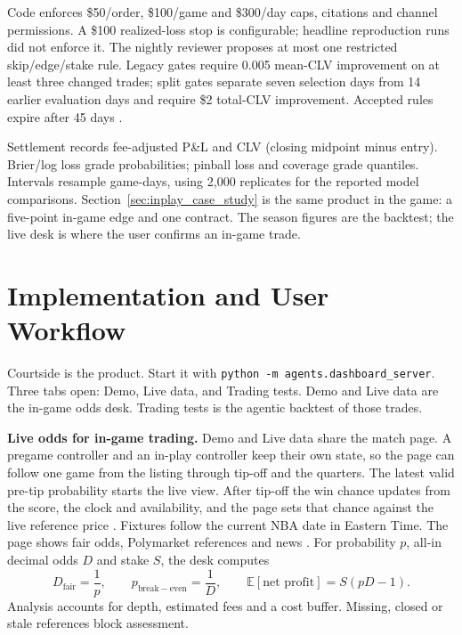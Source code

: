 \documentclass[11pt,a4paper]{article}
\begin{document}
Code enforces \$50/order, \$100/game and \$300/day caps, citations and channel
permissions. A \$100 realized-loss stop is configurable; headline reproduction
runs did not enforce it. The nightly reviewer proposes at most one restricted
skip/edge/stake rule. Legacy gates require 0.005 mean-CLV improvement on at
least three changed trades; split gates separate seven selection days from
14 earlier evaluation days and require \$2 total-CLV improvement. Accepted
rules expire after 45 days \cite{gate-audit}.

Settlement records fee-adjusted P\&L and CLV (closing midpoint minus entry).
Brier/log loss grade probabilities; pinball loss and coverage grade quantiles.
Intervals resample game-days, using 2,000 replicates for the reported model
comparisons. Section~\ref{sec:inplay_case_study} is the same product in the
game: a five-point in-game edge and one contract. The season figures are the
backtest; the live desk is where the user confirms an in-game trade.

\section{Implementation and User Workflow}
\label{sec:implementation}
Courtside is the product. Start it with
\texttt{python -m agents.dashboard\_server}.
Three tabs open: Demo, Live data, and Trading tests. Demo and Live data are
the in-game odds desk. Trading tests is the agentic backtest of those trades.

\textbf{Live odds for in-game trading.} Demo and Live data share the match
page. A pregame controller and an in-play controller keep their own state, so
the page can follow one game from the listing through tip-off and the
quarters. The latest valid pre-tip probability starts the live view. After
tip-off the win chance updates from the score, the clock and availability,
and the page sets that chance against the live reference price
\cite{implementation}. Fixtures follow the current NBA date in Eastern Time.
The page shows fair odds, Polymarket references and news
\cite{polymarket,adapter,courtside}. For probability $p$, all-in
decimal odds $D$ and stake $S$, the desk computes
\begin{equation}
 D_{\mathrm{fair}}=\frac{1}{p},\qquad
 p_{\mathrm{break-even}}=\frac{1}{D},\qquad
 \mathbb{E}[\text{net profit}]=S(pD-1).
 \label{eq:selection-value}
\end{equation}
Analysis accounts for depth, estimated fees and a cost buffer. Missing, closed
or stale references block assessment.
\end{document}
